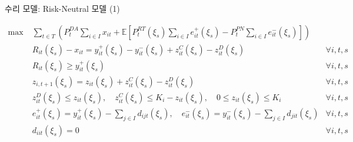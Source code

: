 \documentclass[xcolor=dvipsnames,t,9pt]{beamer}
\begin{document}

\begin{frame}{수리 모델: Risk-Neutral 모델 (1)}
    \vspace{-1em}
    \footnotesize
    \begin{block}{}
        \vspace{-1em}
        \begin{subequations}
            \begin{flalign}
                \text{max} \;                     & \sum_{t \in T} \left(
                P_t^{DA} \sum_{i \in I} x_{it}
                + \mathbb{E}\left[
                P_t^{RT}(\xi_s) \sum_{i \in I} e^+_{it}(\xi_s)
                - P_t^{PN} \sum_{i \in I} e^-_{it}(\xi_s)
                \right]
                \right) \tag{1a}                                                                                                                                                        \\[0.5em]
                                                  & R_{it}(\xi_s) - x_{it} = y_{it}^{+}(\xi_s) - y_{it}^{-}(\xi_s) + z^C_{it}(\xi_s) - z^D_{it}(\xi_s) \quad & \forall i, t, s \tag{1b} \\
                                                  & R_{it}(\xi_s) \geq y^+_{it}(\xi_s) \quad                                                                 & \forall i, t, s \tag{1c} \\
                                                  & z_{i,t+1}(\xi_s) = z_{it}(\xi_s) + z^C_{it}(\xi_s) - z^D_{it}(\xi_s) \quad                               & \forall i, t, s \tag{1d} \\
                                                  & z^D_{it}(\xi_s) \le z_{it}(\xi_s), \quad
                z^C_{it}(\xi_s) \le K_i - z_{it}(\xi_s), \quad
                0 \le z_{it}(\xi_s) \le K_i \quad & \forall i, t, s \tag{1e}                                                                                                            \\
                                                  & e^+_{it}(\xi_s) = y^+_{it}(\xi_s) - \sum_{j \in I} d_{ijt}(\xi_s), \quad
                e^-_{it}(\xi_s) = y^-_{it}(\xi_s) - \sum_{j \in I} d_{jit}(\xi_s)
                                                  & \forall i, t, s \tag{1f}                                                                                                            \\
                                                  & d_{iit}(\xi_s) = 0
                                                  & \forall i, t, s \tag{1g}
            \end{flalign}
        \end{subequations}
    \end{block}


\end{frame}
\end{document}

